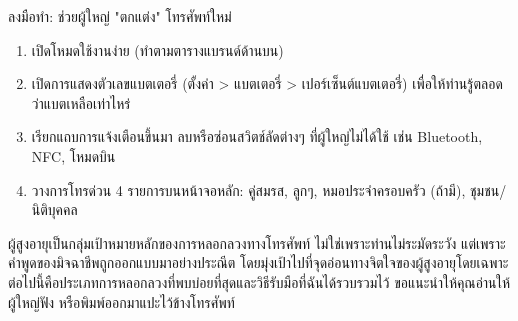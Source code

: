 \begin{tcbpractice}{ลงมือทำ: ช่วยผู้ใหญ่ "ตกแต่ง" โทรศัพท์ใหม่}
\begin{enumerate}
  \item เปิดโหมดใช้งานง่าย (ทำตามตารางแบรนด์ด้านบน)
  \item เปิดการแสดงตัวเลขแบตเตอรี่ (ตั้งค่า > แบตเตอรี่ > เปอร์เซ็นต์แบตเตอรี่) เพื่อให้ท่านรู้ตลอดว่าแบตเหลือเท่าไหร่
  \item เรียกแถบการแจ้งเตือนขึ้นมา ลบหรือซ่อนสวิตช์ลัดต่างๆ ที่ผู้ใหญ่ไม่ได้ใช้ เช่น Bluetooth, NFC, โหมดบิน
  \item วางการโทรด่วน 4 รายการบนหน้าจอหลัก: คู่สมรส, ลูกๆ, หมอประจำครอบครัว (ถ้ามี), ชุมชน/นิติบุคคล
\end{enumerate}

\end{tcbpractice}


ผู้สูงอายุเป็นกลุ่มเป้าหมายหลักของการหลอกลวงทางโทรศัพท์ ไม่ใช่เพราะท่านไม่ระมัดระวัง แต่เพราะคำพูดของมิจฉาชีพถูกออกแบบมาอย่างประณีต โดยมุ่งเป้าไปที่จุดอ่อนทางจิตใจของผู้สูงอายุโดยเฉพาะ ต่อไปนี้คือประเภทการหลอกลวงที่พบบ่อยที่สุดและวิธีรับมือที่ฉันได้รวบรวมไว้ ขอแนะนำให้คุณอ่านให้ผู้ใหญ่ฟัง หรือพิมพ์ออกมาแปะไว้ข้างโทรศัพท์


